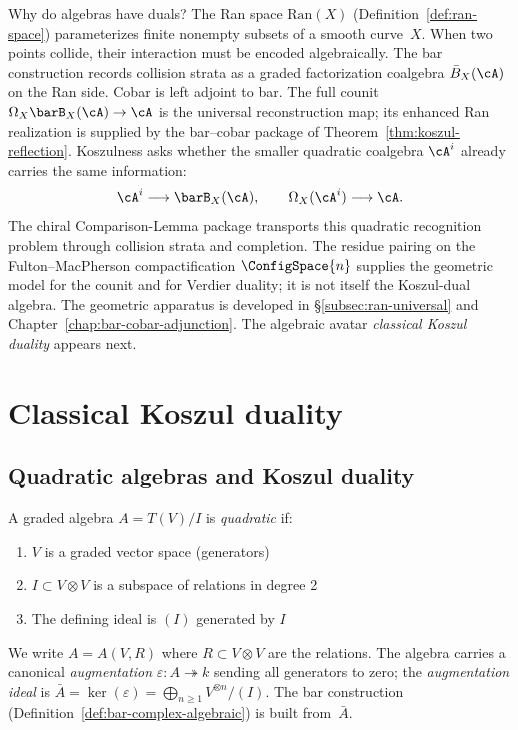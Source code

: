 Why do algebras have duals? The Ran space
$\mathrm{Ran}(X)$ (Definition~\ref{def:ran-space}) parameterizes
finite nonempty subsets of a smooth curve~$X$. When two points
collide, their interaction must be encoded algebraically. The bar
construction records collision strata as a graded factorization
coalgebra $\bar{B}_X(\cA)$ on the Ran side. Cobar is left adjoint to
bar. The full counit $\Omega_X\barB_X(\cA)\to\cA$ is the universal
reconstruction map; its enhanced Ran realization is supplied by the
bar--cobar package of Theorem~\ref{thm:koszul-reflection}. Koszulness
asks whether the smaller quadratic coalgebra $\cA^i$ already carries
the same information:
\[
 \cA^i\longrightarrow\barB_X(\cA),
 \qquad
 \Omega_X(\cA^i)\longrightarrow\cA.
\]
The chiral Comparison-Lemma package transports this quadratic
recognition problem through collision strata and completion.
The residue pairing on the Fulton--MacPherson compactification
$\ConfigSpace{n}$ supplies the geometric model for the counit and
for Verdier duality; it is not itself the Koszul-dual algebra.
The geometric apparatus is developed in
\S\ref{subsec:ran-universal} and
Chapter~\ref{chap:bar-cobar-adjunction}. The algebraic avatar
\textemdash{} \emph{classical Koszul duality} \textemdash{}
appears next.

\section{Classical Koszul duality}
\label{sec:classical-koszul-foundation}

\subsection{Quadratic algebras and Koszul duality}

\begin{definition}
\label{def:quadratic-algebra}
A graded algebra $A = T(V)/I$ is \emph{quadratic} if:
\begin{enumerate}
\item $V$ is a graded vector space (generators)
\item $I \subset V \otimes V$ is a subspace of relations in degree 2
\item The defining ideal is $(I)$ generated by $I$
\end{enumerate}
We write $A = A(V, R)$ where $R \subset V \otimes V$ are the
relations. The algebra carries a canonical \emph{augmentation}
$\varepsilon \colon A \twoheadrightarrow k$ sending all generators
to zero; the \emph{augmentation ideal} is
$\bar{A} = \ker(\varepsilon) = \bigoplus_{n \geq 1} V^{\otimes n}/(I)$.
The bar construction (Definition~\ref{def:bar-complex-algebraic})
is built from~$\bar{A}$.
\end{definition}

